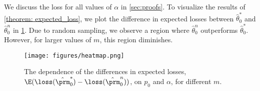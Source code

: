 We discuss the loss for all values of $\alpha$ in \cref{sec:proofs}. To visualize the results of \cref{theorem: expected_loss}, we plot the
difference in expected losses between $\hat{\theta}_0^\ast$ and
$\hat{\theta}_0^n$ in \cref{fig: loss}. Due to random sampling, we observe a region where $\hat{\theta}_0^n$ outperforms
$\hat{\theta}_0^\ast$. However,
for larger values of $m$, this region diminishes.



\begin{figure}[ht]
    \texttt{[image: figures/heatmap.png]}
    \caption{The dependence of the differences in expected
    losses, $\E(\loss(\hat{\prm}^*_0) - \loss(\hat{\prm}^n_0))$, on $p_0$ and
    $\alpha$, for different $m$.}
    \label{fig: loss}
\end{figure}
